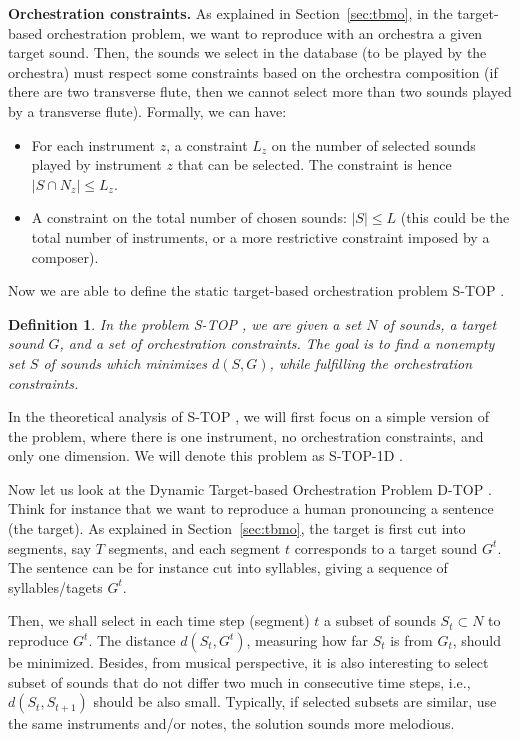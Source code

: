 \documentclass[a4paper]{book}
\newtheorem{definition}{Definition}
\newcommand{\stat}{{\sc S-TOP }}
\newcommand{\statoned}{{\sc S-TOP-1D }}
\newcommand{\dyn}{{\sc D-TOP }}
\begin{document}
{\bf Orchestration constraints.} As explained in Section~\ref{sec:tbmo}, in the target-based orchestration problem, we want to reproduce with an orchestra a given target sound. Then, the sounds we select in the database (to be played by the orchestra) must respect some constraints based on the orchestra composition (if there are two transverse flute, then we cannot select more than two sounds played by a transverse flute). Formally, we can have:
\begin{itemize}
    \item For each instrument $z$, a constraint $L_z$ on the number of selected sounds played by instrument $z$ that can be selected. The constraint is hence $|S\cap N_z|\leq L_z$.
    \item A constraint on the total number of chosen sounds: $|S|\leq L$ (this could be the total number of instruments, or a more restrictive constraint imposed by a composer).
\end{itemize}


Now we are able to define the static target-based orchestration problem \stat.

\begin{definition}
In the problem \stat, we are given a set $N$ of sounds, a target sound $G$, and a set of orchestration constraints. The goal is to find a nonempty set $S$ of sounds which minimizes $d(S,G)$, while fulfilling the orchestration constraints.
\end{definition}

In the theoretical analysis of \stat, we will first focus on a simple version of the problem, where there is one instrument, no orchestration constraints, and only one dimension. We will denote this problem as \statoned.  


Now let us look at the Dynamic Target-based Orchestration Problem \dyn. Think for instance that we want to reproduce a human pronouncing a sentence (the target). As explained in Section~\ref{sec:tbmo}, the target is first cut into segments, say $T$ segments, and each segment $t$ corresponds to a target sound $G^t$. The sentence can be for instance cut into syllables, giving a sequence of syllables/tagets $G^t$. 

Then, we shall select in each time step (segment) $t$ a subset of sounds $S_t\subset N$ to reproduce $G^t$. The distance $d(S_t,G^t)$, measuring how far $S_t$ is from $G_t$, should be minimized. Besides, from musical perspective, it is also interesting to select subset of sounds that do not differ two much in consecutive time steps, i.e., $d(S_t,S_{t+1})$ should be also small. Typically, if selected subsets are similar, use the same instruments and/or notes, the solution sounds more melodious. 
\end{document}
